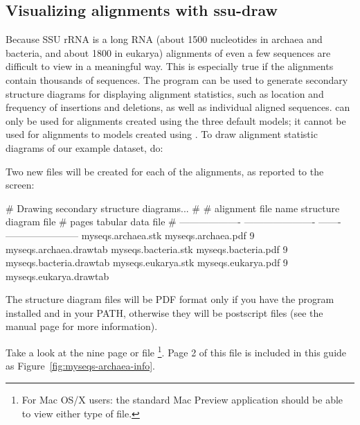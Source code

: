 \subsection{Visualizing alignments with ssu-draw}

Because SSU rRNA is a long RNA (about 1500 nucleotides in archaea and
bacteria, and about 1800 in eukarya) alignments of even a few
sequences are difficult to view in a meaningful way. This is
especially true if the alignments contain thousands of sequences.  The
 program can be used to generate secondary structure
diagrams for displaying alignment statistics, such as location and
frequency of insertions and deletions, as well as individual aligned
sequences.  can only be used for alignments created
using the three default models; it cannot be used for alignments to
models created using .  To draw alignment statistic
diagrams of our  example dataset, do:


Two new files will be created for each of the alignments, as reported
to the screen:

\begin{sreoutput}
# Drawing secondary structure diagrams...
#
# alignment file name  structure diagram file  # pages  tabular data file      
# -------------------  ----------------------  -------  -----------------------
  myseqs.archaea.stk   myseqs.archaea.pdf            9  myseqs.archaea.drawtab 
  myseqs.bacteria.stk  myseqs.bacteria.pdf           9  myseqs.bacteria.drawtab
  myseqs.eukarya.stk   myseqs.eukarya.pdf            9  myseqs.eukarya.drawtab 
\end{sreoutput}

The structure diagram files will be PDF format only if you have the
program  installed and in your PATH, otherwise they will
be postscript files (see the  manual page for more
information). 

Take a look at the nine page  or
 file \footnote{For Mac OS/X users: the standard
  Mac Preview application should be able to view either type of
  file.}.  Page 2 of this file is included in this guide as
Figure~\ref{fig:myseqs-archaea-info}.

